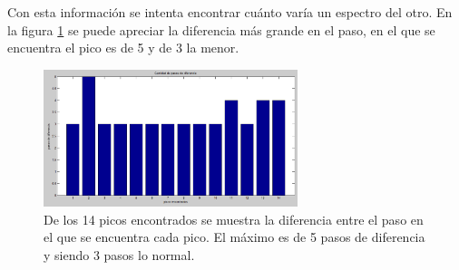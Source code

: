 Con esta información se intenta encontrar cuánto varía un espectro del otro. En la figura \ref{fig:pasoserror} se puede apreciar la diferencia más grande en el paso, en el que se encuentra el pico es de 5 y de 3 la menor. %

\begin{figure}[h]
	\centering
	\includegraphics[width=0.7\linewidth,height=4cm]{Imagenes/3/pasosError}
	\caption[Diferencias de pasos en los picos encontrados.]{De los 14 picos encontrados se muestra la diferencia entre el paso en el que se encuentra cada pico. El máximo es de 5 pasos de diferencia y siendo 3 pasos lo normal.}
	\label{fig:pasoserror}
\end{figure}

 

